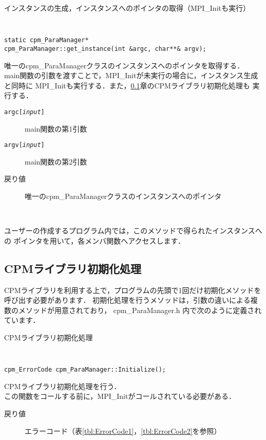 \begin{spacing}{0.8}
\begin{itembox}[l]{インスタンスの生成，インスタンスへのポインタの取得（MPI\_Initも実行）}
{\tt
\begin{verbatim}
static cpm_ParaManager*
cpm_ParaManager::get_instance(int &argc, char**& argv);
\end{verbatim}
}
唯一のcpm\_ParaManagerクラスのインスタンスへのポインタを取得する．\\
main関数の引数を渡すことで，MPI\_Initが未実行の場合に，インスタンス生成と同時に
MPI\_Initも実行する．また，\ref{CPMinit}章のCPMライブラリ初期化処理も
実行する．
\begin{description}
\item[{\tt argc[{\it input}]}] main関数の第1引数
\item[{\tt argv[{\it input}]}] main関数の第2引数
\\
\item[戻り値] 唯一のcpm\_ParaManagerクラスのインスタンスへのポインタ
\end{description}
\end{itembox}\\
\end{spacing}

ユーザーの作成するプログラム内では，このメソッドで得られたインスタンスへの
ポインタを用いて，各メンバ関数へアクセスします．


\clearpage


\subsection{CPMライブラリ初期化処理}
\label{CPMinit}

CPMライブラリを利用する上で，プログラムの先頭で1回だけ初期化メソッドを呼び出す必要があります．
初期化処理を行うメソッドは，引数の違いによる複数のメソッドが用意されており，
cpm\_ParaManager.h 内で次のように定義されています．\\

\begin{spacing}{0.8}
\begin{itembox}[l]{CPMライブラリ初期化処理}
{\tt
\begin{verbatim}
cpm_ErrorCode cpm_ParaManager::Initialize();
\end{verbatim}
}
CPMライブラリ初期化処理を行う．\\
この関数をコールする前に，MPI\_Initがコールされている必要がある．
\begin{description}
\item[戻り値] エラーコード（表\ref{tbl:ErrorCode1}，\ref{tbl:ErrorCode2}を参照）
\end{description}
\end{itembox}\\
\end{spacing}

